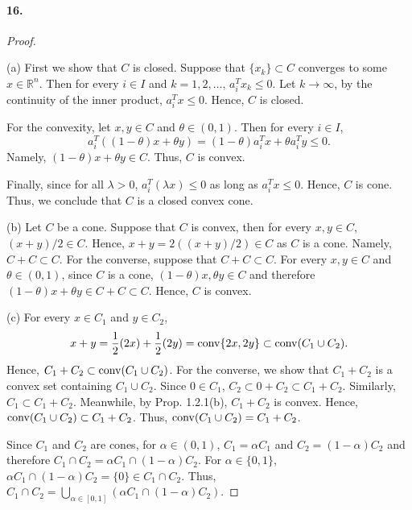   \paragraph{16.}
  \begin{proof}
    $\,$\par
    (a) First we show that $C$ is closed. Suppose that $\{x_k\}\subset C$ 
    converges to some $x\in\mathbb{R}^n$. Then for every $i\in I$ and $k=1,2,
    \dots$, $a_i^Tx_k\le 0$. Let $k\to\infty$, by the continuity of the inner
    product, $a_i^Tx\le 0$. Hence, $C$ is closed.\par
    For the convexity, let $x,y\in C$ and $\theta\in(0,1)$. Then for every 
    $i\in I$,
    \[
      a_i^T((1-\theta)x+\theta y)=(1-\theta)a_i^Tx+\theta a_i^Ty\le 0.
    \]
    Namely, $(1-\theta)x+\theta y\in C$. Thus, $C$ is convex.\par
    Finally, since for all $\lambda>0$, $a_i^T(\lambda x)\le 0$ as long as
    $a_i^Tx\le 0$. Hence, $C$ is cone. Thus, we conclude that $C$ is a closed
    convex cone.\par
    (b) Let $C$ be a cone. Suppose that $C$ is convex, then for every $x,y\in 
    C$, $(x+y)/2\in C$. Hence, $x+y=2((x+y)/2)\in C$ as $C$ is a cone. Namely,
    $C+C\subset C$. For the converse, suppose that $C+C\subset C$. For every
    $x,y\in C$ and $\theta\in(0,1)$, since $C$ is a cone, $(1-\theta)x,\theta 
    y\in C$ and therefore $(1-\theta)x+\theta y\in C+C\subset C$. Hence, $C$
    is convex.\par
    (c) For every $x\in C_1$ and $y\in C_2$,
    \[
      x+y=\frac{1}{2}(2x)+\frac{1}{2}(2y)=\operatorname{conv}\{2x,2y\}\subset
      \operatorname{conv}(C_1\cup C_2).
    \]
    Hence, $C_1+C_2\subset\operatorname{conv}(C_1\cup C_2)$. For the converse, we show that
    $C_1+C_2$ is a convex set containing $C_1\cup C_2$. Since $0\in C_1$, $C_2
    \subset 0+C_2\subset C_1+C_2$. Similarly, $C_1\subset C_1+C_2$. Meanwhile,
    by Prop. 1.2.1(b), $C_1+C_2$ is convex. Hence, $\operatorname{conv}(C_1\cup C_2)\subset
    C_1+C_2$. Thus, $\operatorname{conv}(C_1\cup C_2)=C_1+C_2$.\par
    Since $C_1$ and $C_2$ are cones, for $\alpha\in(0,1)$, $C_1=\alpha C_1$ and 
    $C_2=(1-\alpha)C_2$ and therefore $C_1\cap C_2=\alpha C_1\cap(1-\alpha)
    C_2$. For $\alpha\in\{0,1\}$, $\alpha C_1\cap(1-\alpha)C_2=\{0\}\in C_1\cap 
    C_2$. Thus, $C_1\cap C_2=\bigcup_{\alpha\in[0,1]}(\alpha C_1\cap(1-\alpha)
    C_2)$.
  \end{proof}
  
